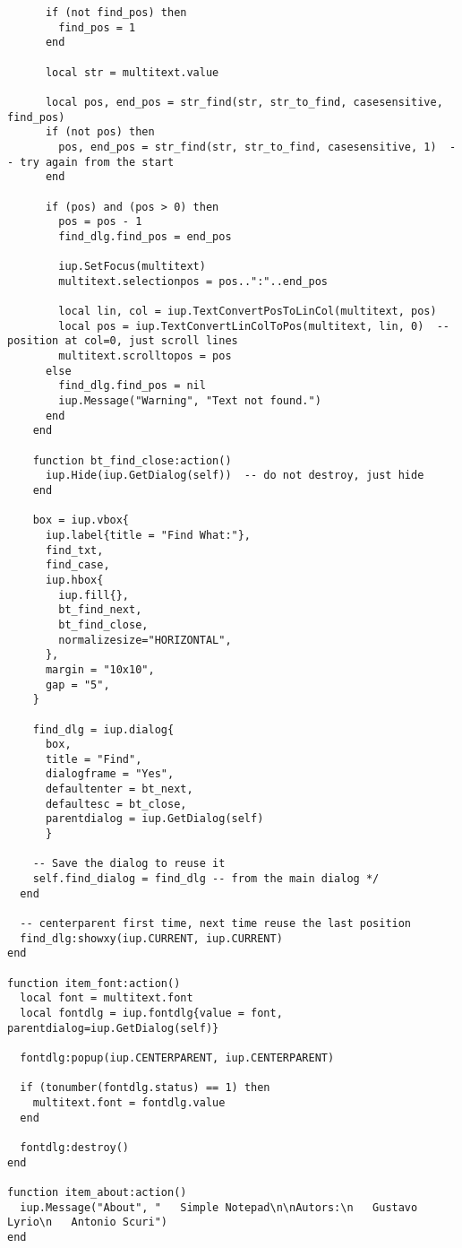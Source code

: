 \documentclass{ctexart}
\begin{document}
\begin{lstlisting}
      if (not find_pos) then
        find_pos = 1
      end

      local str = multitext.value

      local pos, end_pos = str_find(str, str_to_find, casesensitive, find_pos)
      if (not pos) then
        pos, end_pos = str_find(str, str_to_find, casesensitive, 1)  -- try again from the start
      end

      if (pos) and (pos > 0) then
        pos = pos - 1
        find_dlg.find_pos = end_pos

        iup.SetFocus(multitext)
        multitext.selectionpos = pos..":"..end_pos

        local lin, col = iup.TextConvertPosToLinCol(multitext, pos)
        local pos = iup.TextConvertLinColToPos(multitext, lin, 0)  -- position at col=0, just scroll lines
        multitext.scrolltopos = pos
      else
        find_dlg.find_pos = nil
        iup.Message("Warning", "Text not found.")
      end
    end

    function bt_find_close:action()
      iup.Hide(iup.GetDialog(self))  -- do not destroy, just hide
    end

    box = iup.vbox{
      iup.label{title = "Find What:"},
      find_txt,
      find_case,
      iup.hbox{
        iup.fill{},
        bt_find_next,
        bt_find_close,
        normalizesize="HORIZONTAL", 
      },
      margin = "10x10", 
      gap = "5",
    }

    find_dlg = iup.dialog{
      box, 
      title = "Find", 
      dialogframe = "Yes", 
      defaultenter = bt_next, 
      defaultesc = bt_close,
      parentdialog = iup.GetDialog(self)
      }

    -- Save the dialog to reuse it 
    self.find_dialog = find_dlg -- from the main dialog */
  end

  -- centerparent first time, next time reuse the last position
  find_dlg:showxy(iup.CURRENT, iup.CURRENT)
end

function item_font:action()
  local font = multitext.font
  local fontdlg = iup.fontdlg{value = font, parentdialog=iup.GetDialog(self)}

  fontdlg:popup(iup.CENTERPARENT, iup.CENTERPARENT)

  if (tonumber(fontdlg.status) == 1) then
    multitext.font = fontdlg.value
  end

  fontdlg:destroy()
end

function item_about:action()
  iup.Message("About", "   Simple Notepad\n\nAutors:\n   Gustavo Lyrio\n   Antonio Scuri")
end



\end{lstlisting}
\end{document}
